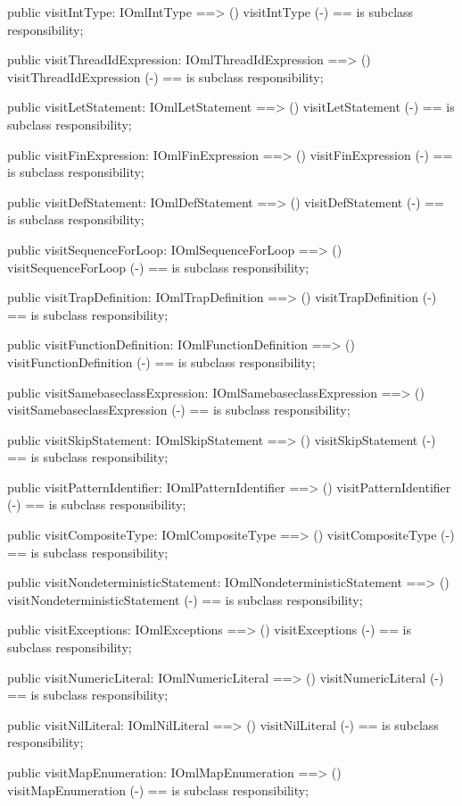 \begin{vdm_al}
  public visitIntType: IOmlIntType ==> ()
  visitIntType (-) == is subclass responsibility;

  public visitThreadIdExpression: IOmlThreadIdExpression ==> ()
  visitThreadIdExpression (-) == is subclass responsibility;

  public visitLetStatement: IOmlLetStatement ==> ()
  visitLetStatement (-) == is subclass responsibility;

  public visitFinExpression: IOmlFinExpression ==> ()
  visitFinExpression (-) == is subclass responsibility;

  public visitDefStatement: IOmlDefStatement ==> ()
  visitDefStatement (-) == is subclass responsibility;

  public visitSequenceForLoop: IOmlSequenceForLoop ==> ()
  visitSequenceForLoop (-) == is subclass responsibility;

  public visitTrapDefinition: IOmlTrapDefinition ==> ()
  visitTrapDefinition (-) == is subclass responsibility;

  public visitFunctionDefinition: IOmlFunctionDefinition ==> ()
  visitFunctionDefinition (-) == is subclass responsibility;

  public visitSamebaseclassExpression: IOmlSamebaseclassExpression ==> ()
  visitSamebaseclassExpression (-) == is subclass responsibility;

  public visitSkipStatement: IOmlSkipStatement ==> ()
  visitSkipStatement (-) == is subclass responsibility;

  public visitPatternIdentifier: IOmlPatternIdentifier ==> ()
  visitPatternIdentifier (-) == is subclass responsibility;

  public visitCompositeType: IOmlCompositeType ==> ()
  visitCompositeType (-) == is subclass responsibility;

  public visitNondeterministicStatement: IOmlNondeterministicStatement ==> ()
  visitNondeterministicStatement (-) == is subclass responsibility;

  public visitExceptions: IOmlExceptions ==> ()
  visitExceptions (-) == is subclass responsibility;

  public visitNumericLiteral: IOmlNumericLiteral ==> ()
  visitNumericLiteral (-) == is subclass responsibility;

  public visitNilLiteral: IOmlNilLiteral ==> ()
  visitNilLiteral (-) == is subclass responsibility;

  public visitMapEnumeration: IOmlMapEnumeration ==> ()
  visitMapEnumeration (-) == is subclass responsibility;


\end{vdm_al}
